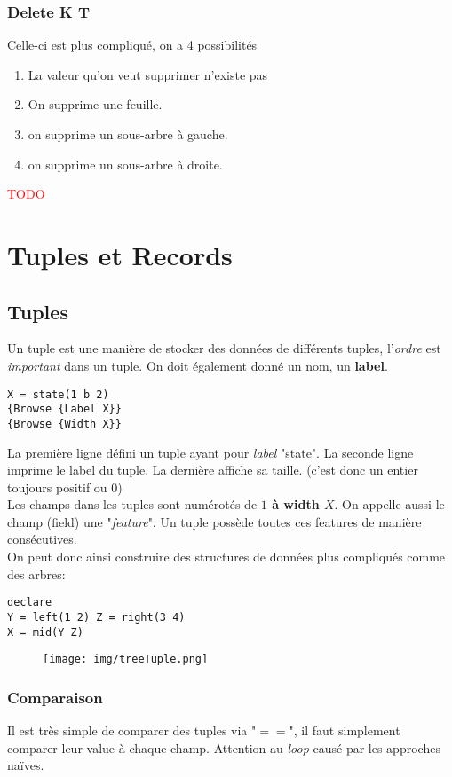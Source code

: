 \documentclass{report}
\begin{document}
\subsubsection{Delete K T}
Celle-ci est plus compliqué, on a 4 possibilités
\begin{enumerate}
\item La valeur qu'on veut supprimer n'existe pas
\item On supprime une feuille.
\item on supprime un sous-arbre à gauche.
\item on supprime un sous-arbre à droite.
\end{enumerate}
\textcolor{red}{TODO} %

\section{Tuples et Records}

\subsection{Tuples}
Un tuple est une manière de stocker des données de différents tuples, l'\textit{ordre} est \textit{important} dans un tuple. On doit également donné un nom, un \textbf{label}.
\begin{lstlisting}
X = state(1 b 2)
{Browse {Label X}}
{Browse {Width X}}
\end{lstlisting}
La première ligne défini un tuple ayant pour \textit{label} "state". La seconde ligne imprime le label du tuple. La dernière affiche sa taille. (c'est donc un entier toujours positif ou $0$)\\
Les champs dans les tuples sont numérotés de\textbf{ $1$ à width $X$}. On appelle aussi le champ (field) une "\textit{feature}". Un tuple possède toutes ces features de manière consécutives.\\

On peut donc ainsi construire des structures de données plus compliqués comme des arbres:
\begin{lstlisting}
declare
Y = left(1 2) Z = right(3 4)
X = mid(Y Z)
\end{lstlisting}

\begin{figure}[H]
\centering
\texttt{[image: img/treeTuple.png]}
\end{figure}
\subsubsection{Comparaison}
Il est très simple de comparer des tuples via "$==$", il faut simplement comparer leur value à chaque champ. Attention au \textit{loop} causé par les approches naïves.\\
\end{document}
